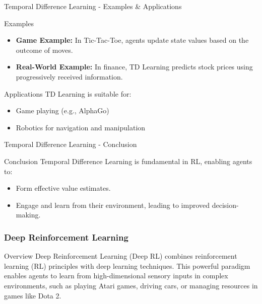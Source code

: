 \documentclass[aspectratio=169]{beamer}
\begin{document}
\begin{frame}[fragile]{Temporal Difference Learning - Examples & Applications}
    \begin{block}{Examples}
        \begin{itemize}
            \item \textbf{Game Example:} In Tic-Tac-Toe, agents update state values based on the outcome of moves.
            \item \textbf{Real-World Example:} In finance, TD Learning predicts stock prices using progressively received information.
        \end{itemize}
    \end{block}

    \begin{block}{Applications}
        TD Learning is suitable for:
        \begin{itemize}
            \item Game playing (e.g., AlphaGo)
            \item Robotics for navigation and manipulation
        \end{itemize}
    \end{block}
\end{frame}

\begin{frame}[fragile]{Temporal Difference Learning - Conclusion}
    \begin{block}{Conclusion}
        Temporal Difference Learning is fundamental in RL, enabling agents to:
        \begin{itemize}
            \item Form effective value estimates.
            \item Engage and learn from their environment, leading to improved decision-making.
        \end{itemize}
    \end{block}
\end{frame}

\begin{frame}[fragile]
    \frametitle{Deep Reinforcement Learning}
    \begin{block}{Overview}
        Deep Reinforcement Learning (Deep RL) combines reinforcement learning (RL) principles with deep learning techniques. This powerful paradigm enables agents to learn from high-dimensional sensory inputs in complex environments, such as playing Atari games, driving cars, or managing resources in games like Dota 2.
    \end{block}
\end{frame}
\end{document}
